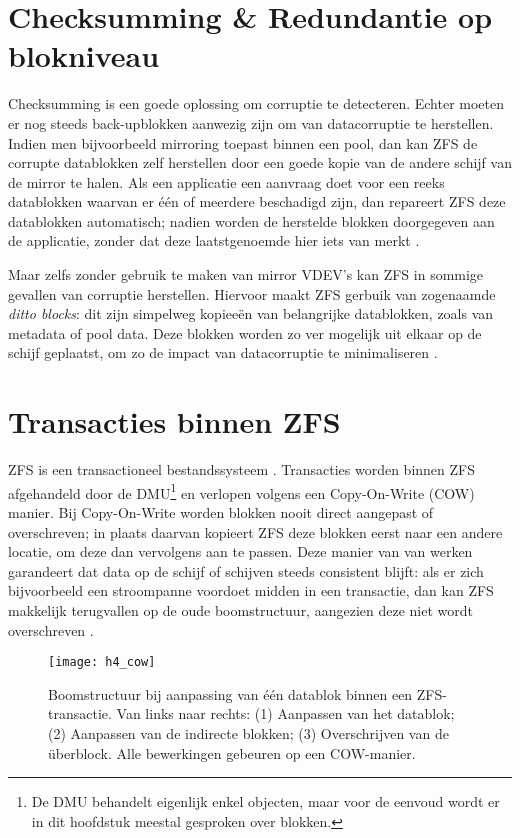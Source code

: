 \section{Checksumming \& Redundantie op blokniveau}

Checksumming is een goede oplossing om corruptie te detecteren. Echter moeten er nog steeds back-upblokken aanwezig zijn om van datacorruptie te herstellen. Indien men bijvoorbeeld mirroring toepast binnen een pool, dan kan ZFS de corrupte datablokken zelf herstellen door een goede kopie van de andere schijf van de mirror te halen. Als een applicatie een aanvraag doet voor een reeks datablokken waarvan er één of meerdere beschadigd zijn, dan repareert ZFS deze datablokken automatisch; nadien worden de herstelde blokken doorgegeven aan de applicatie, zonder dat deze laatstgenoemde hier iets van merkt \autocite{ZFSBonwick}.

Maar zelfs zonder gebruik te maken van mirror VDEV's kan ZFS in sommige gevallen van corruptie herstellen. Hiervoor maakt ZFS gerbuik van zogenaamde \textit{ditto blocks}: dit zijn simpelweg kopieeën van belangrijke datablokken, zoals van metadata of pool data. Deze blokken worden zo ver mogelijk uit elkaar op de schijf geplaatst, om zo de impact van datacorruptie te minimaliseren \autocite{Lucas2015}. 

\section{Transacties binnen ZFS}

ZFS is een transactioneel bestandssysteem \autocite{ZFSBonwick}. Transacties worden binnen ZFS afgehandeld door de DMU\footnote{De DMU behandelt eigenlijk enkel objecten, maar voor de eenvoud wordt er in dit hoofdstuk meestal gesproken over blokken.} en verlopen volgens een Copy-On-Write (COW) manier. Bij Copy-On-Write worden blokken nooit direct aangepast of overschreven; in plaats daarvan kopieert ZFS deze blokken eerst naar een andere locatie, om deze dan vervolgens aan te passen. Deze manier van van werken garandeert dat data op de schijf of schijven steeds consistent blijft: als er zich bijvoorbeeld een stroompanne voordoet midden in een transactie, dan kan ZFS makkelijk terugvallen op de oude boomstructuur, aangezien deze niet wordt overschreven \autocite{Lucas2015}.

\begin{figure}
        \centering
        \texttt{[image: h4\_cow]}
        \caption{Boomstructuur bij aanpassing van één datablok binnen een ZFS-transactie. Van links naar rechts: (1) Aanpassen van het datablok; (2) Aanpassen van de indirecte blokken; (3) Overschrijven van de \"{u}berblock. Alle bewerkingen gebeuren op een COW-manier. \autocite{ZFSBonwick}}
        \label{fig:bonwick_cow_illustratie}
\end{figure}


